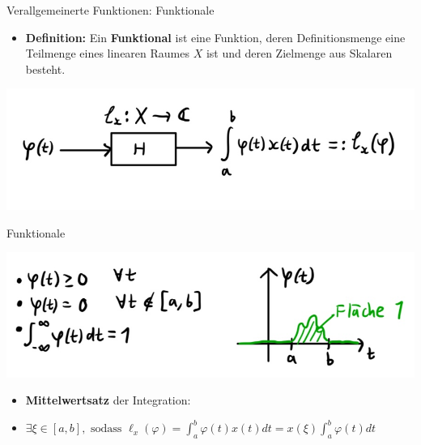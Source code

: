 \documentclass[14pt, aspectratio=169, handout]{beamer}
\begin{document}
\begin{frame}{Verallgemeinerte Funktionen: Funktionale}
    \begin{itemize}
        \item \textbf{Definition:} Ein \textbf{Funktional} ist eine Funktion, deren Definitionsmenge eine Teilmenge eines linearen Raumes $X$ ist und deren Zielmenge aus Skalaren besteht.
    \end{itemize}
    \begin{center}
        \includegraphics[width=0.8\linewidth]{figures/Funktionale_2 copy.jpg}
    \end{center}
\end{frame}

\begin{frame}{Funktionale}
    \begin{center}
        \includegraphics[width=0.8\linewidth]{figures/Funktionale_3.jpg}
    \end{center}
    \begin{itemize}
        \item \textbf{Mittelwertsatz} der Integration: 
        \item[] $\exists \xi \in [a,b], \text{ sodass }  \ell_x(\varphi) = \displaystyle\int_a^b \varphi(t)x(t)dt = x(\xi)\displaystyle\int_a^b \varphi(t)dt$
    \end{itemize}
\end{frame}
\end{document}

